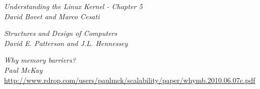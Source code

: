 \documentclass{article}
\begin{document}
\begin{thebibliography}{9}
  \textit{Understanding the Linux Kernel - Chapter 5} \\
  \textit{David Bovet and Marco Cesati}  

  \textit{Structures and Design of Computers } \\
  \textit{David E. Patterson and J.L. Hennessey} 
  
  \textit{Why memory barriers?} \\
  \textit{Paul McKay} \\
  \url{http://www.rdrop.com/users/paulmck/scalability/paper/whymb.2010.06.07c.pdf}
\end{thebibliography}
\end{document}
